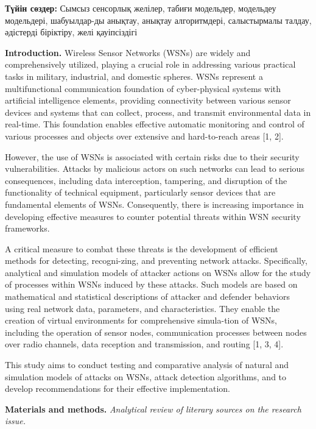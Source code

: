 {\bfseries Түйін сөздер:} Сымсыз сенсорлық желілер, табиғи модельдер,
модельдеу модельдері, шабуылдар-ды анықтау, анықтау алгоритмдері,
салыстырмалы талдау, әдістерді біріктіру, желі қауіпсіздігі
\begin{multicols}{2}

{\bfseries Introduction.} Wireless Sensor Networks (WSNs) are widely and
comprehensively utilized, playing a crucial role in addressing various
practical tasks in military, industrial, and domestic spheres. WSNs
represent a multifunctional communication foundation of cyber-physical
systems with artificial intelligence elements, providing connectivity
between various sensor devices and systems that can collect, process,
and transmit environmental data in real-time. This foundation enables
effective automatic monitoring and control of various processes and
objects over extensive and hard-to-reach areas {[}1, 2{]}.

However, the use of WSNs is associated with certain risks due to their
security vulnerabilities. Attacks by malicious actors on such networks
can lead to serious consequences, including data interception,
tampering, and disruption of the functionality of technical equipment,
particularly sensor devices that are fundamental elements of WSNs.
Consequently, there is increasing importance in developing effective
measures to counter potential threats within WSN security frameworks.

A critical measure to combat these threats is the development of
efficient methods for detecting, recogni-zing, and preventing network
attacks. Specifically, analytical and simulation models of attacker
actions on WSNs allow for the study of processes within WSNs induced by
these attacks. Such models are based on mathematical and statistical
descriptions of attacker and defender behaviors using real network data,
parameters, and characteristics. They enable the creation of virtual
environments for comprehensive simula-tion of WSNs, including the
operation of sensor nodes, communication processes between nodes over
radio channels, data reception and transmission, and routing {[}1, 3,
4{]}.

This study aims to conduct testing and comparative analysis of natural
and simulation models of attacks on WSNs, attack detection algorithms,
and to develop recommendations for their effective implementation.

{\bfseries Materials and methods.} \emph{Analytical review of literary
sources on the research issue.}


\end{multicols}
